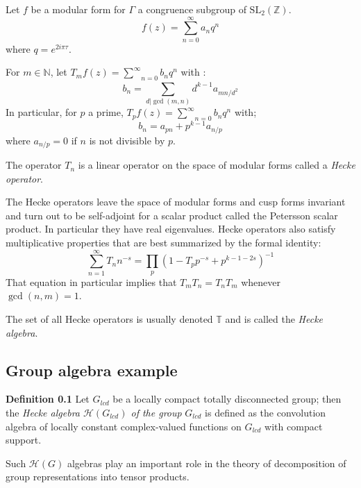 \documentclass[12pt]{article}
\newcommand{\sldeuxz}{\textrm{SL}_{2}(\mathbb Z)}
\newcommand{\somme}[2]{\underset{#1}{\overset{#2}{\sum}}}
\begin{document}
Let $f$ be a modular form for $\Gamma$ a congruence subgroup of $\sldeuxz$.
\begin{equation}
f(z)=\somme{n=0}{\infty}a_{n}q^n
\end{equation}
where $q=e^{2i\pi \tau}$. 

For $m\in \mathbb N$, let $T_{m}f(z)=\somme{n=0}{\infty}b_{n}q^n$ with :
\begin{equation}
b_{n}=\somme{d|\gcd(m,n)}{}d^{k-1}a_{mn/d^2}
\end{equation}
In particular, for $p$ a prime, $T_{p}f(z)=\somme{n=0}{\infty}b_{n}q^n$ with;
\begin{equation}
b_{n}=a_{pn}+p^{k-1}a_{n/p}
\end{equation}
where $a_{n/p}=0$ if $n$ is not divisible by $p$.

The operator $T_n$ is a linear operator on the space of modular forms called a \emph{Hecke operator}.


The Hecke operators leave the space of modular forms and cusp forms invariant
and turn out to be self-adjoint for a scalar product called the Petersson 
scalar product. In particular they have real eigenvalues. Hecke operators
also satisfy multiplicative properties that are best summarized by the formal
identity:
\begin{equation}
\underset{n=1}{\overset{\infty}{\sum}}T_{n}n^{-s}=\underset{p}{\prod}(1-
T_{p}p^{-s}+p^{k-1-2s})^{-1}
\end{equation}
That equation in particular implies that $T_mT_n=T_nT_m$ whenever $\gcd(n,m)=1$.

The set of all Hecke operators is usually denoted $\mathbb T$ and is called the \emph{Hecke algebra}.

\subsection{Group algebra example}
\textbf{Definition 0.1}
Let $G_{lcd}$ be a locally compact totally disconnected group; then the 
\emph{Hecke algebra $\mathcal{H}(G_{lcd})$ of the group} $G_{lcd}$ is defined as the convolution algebra of 
locally constant complex-valued functions on $G_{lcd}$ with compact support. 


Such $\mathcal{H}(G)$ algebras play an important role in the theory of 
decomposition of group representations into tensor products.



\end{document}
